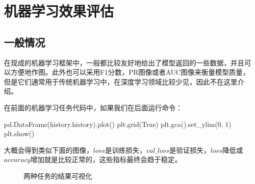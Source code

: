\documentclass[a5paper, 11pt]{ctexbook}
\begin{document}

\chapter{机器学习效果评估} \label{评价方法}

\section{一般情况}

在现成的机器学习框架中，一般都比较友好地给出了模型返回的一些数据，并且可以方便地作图。此外也可以采用F1分数，PR图像或者AUC图像来衡量模型质量，但是它们通常用于传统机器学习中，在深度学习领域比较少见，因此不在这里介绍。

在前面的机器学习任务代码中，如果我们在后面运行命令：

\begin{python}
    pd.DataFrame(history.history).plot()
    plt.grid(True)
    plt.gca().set_ylim(0, 1)
    plt.show()
\end{python}

大概会得到类似下面的图像，$loss$是训练损失，$val\_loss$是验证损失，$loss$降低或$accuracy$增加就是比较正常的，这些指标最终会趋于稳定。

\newpage

\begin{figure}[h]
    \centering
    \caption{两种任务的结果可视化}
\end{figure}
\end{document}
